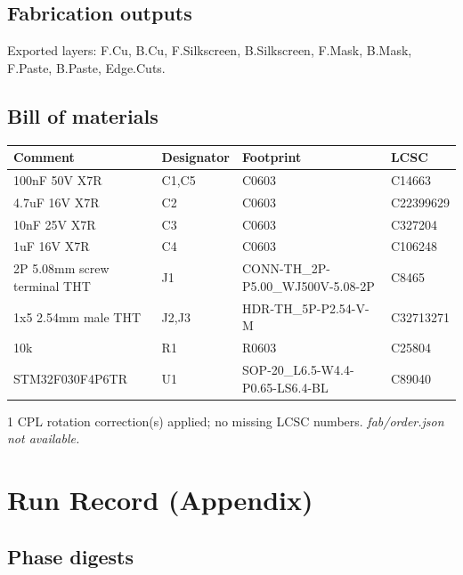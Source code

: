\documentclass[11pt,a4paper]{article}
\begin{document}
\subsection*{Fabrication outputs}
Exported layers: F.Cu, B.Cu, F.Silkscreen, B.Silkscreen, F.Mask, B.Mask, F.Paste, B.Paste, Edge.Cuts.
\subsection*{Bill of materials}
{\small
\begin{longtable}{p{4.4cm}p{2.8cm}p{4.6cm}l}
\toprule
\textbf{Comment} & \textbf{Designator} & \textbf{Footprint} & \textbf{LCSC} \\
\midrule
\endhead
100nF 50V X7R & C1,C5 & C0603 & C14663 \\
4.7uF 16V X7R & C2 & C0603 & C22399629 \\
10nF 25V X7R & C3 & C0603 & C327204 \\
1uF 16V X7R & C4 & C0603 & C106248 \\
2P 5.08mm screw terminal THT & J1 & CONN-TH\_2P-P5.00\_WJ500V-5.08-2P & C8465 \\
1x5 2.54mm male THT & J2,J3 & HDR-TH\_5P-P2.54-V-M & C32713271 \\
10k & R1 & R0603 & C25804 \\
STM32F030F4P6TR & U1 & SOP-20\_L6.5-W4.4-P0.65-LS6.4-BL & C89040 \\
\bottomrule
\end{longtable}
}
1 CPL rotation correction(s) applied; no missing LCSC numbers.
\emph{fab/order.json not available.}
\section{Run Record (Appendix)}
\subsection*{Phase digests}
\end{document}
